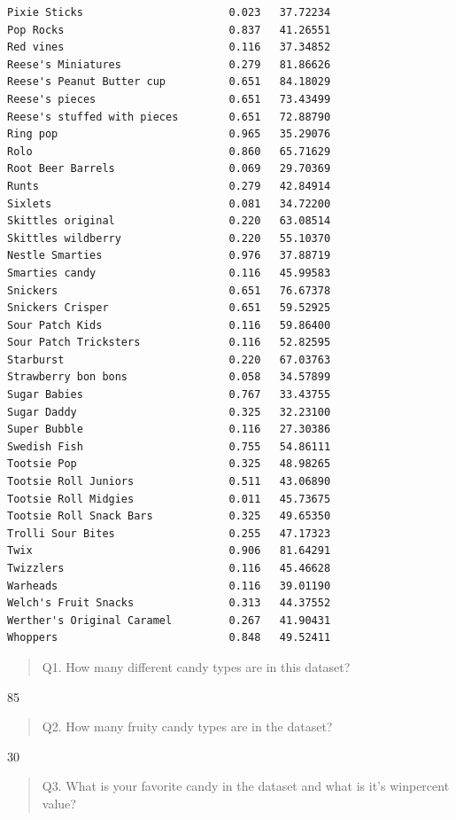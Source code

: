 \documentclass[
  letterpaper,
  DIV=11,
  numbers=noendperiod]{scrartcl}
\begin{document}
\begin{verbatim}
Pixie Sticks                       0.023   37.72234
Pop Rocks                          0.837   41.26551
Red vines                          0.116   37.34852
Reese's Miniatures                 0.279   81.86626
Reese's Peanut Butter cup          0.651   84.18029
Reese's pieces                     0.651   73.43499
Reese's stuffed with pieces        0.651   72.88790
Ring pop                           0.965   35.29076
Rolo                               0.860   65.71629
Root Beer Barrels                  0.069   29.70369
Runts                              0.279   42.84914
Sixlets                            0.081   34.72200
Skittles original                  0.220   63.08514
Skittles wildberry                 0.220   55.10370
Nestle Smarties                    0.976   37.88719
Smarties candy                     0.116   45.99583
Snickers                           0.651   76.67378
Snickers Crisper                   0.651   59.52925
Sour Patch Kids                    0.116   59.86400
Sour Patch Tricksters              0.116   52.82595
Starburst                          0.220   67.03763
Strawberry bon bons                0.058   34.57899
Sugar Babies                       0.767   33.43755
Sugar Daddy                        0.325   32.23100
Super Bubble                       0.116   27.30386
Swedish Fish                       0.755   54.86111
Tootsie Pop                        0.325   48.98265
Tootsie Roll Juniors               0.511   43.06890
Tootsie Roll Midgies               0.011   45.73675
Tootsie Roll Snack Bars            0.325   49.65350
Trolli Sour Bites                  0.255   47.17323
Twix                               0.906   81.64291
Twizzlers                          0.116   45.46628
Warheads                           0.116   39.01190
Welch's Fruit Snacks               0.313   44.37552
Werther's Original Caramel         0.267   41.90431
Whoppers                           0.848   49.52411
\end{verbatim}

\begin{quote}
Q1. How many different candy types are in this dataset?
\end{quote}

85

\begin{quote}
Q2. How many fruity candy types are in the dataset?
\end{quote}

30

\begin{quote}
Q3. What is your favorite candy in the dataset and what is it's
winpercent value?
\end{quote}
\end{document}
